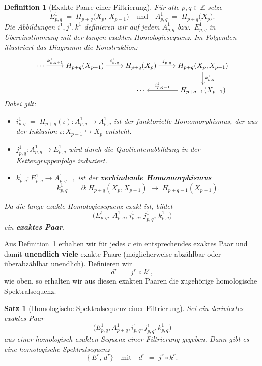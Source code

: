 \documentclass[12pt]{article}
\numberwithin{conj}{section}
\newtheorem{definition}[conj]{Definition}
\newtheorem{theorem}[conj]{Satz}
\newcommand{\Z}{\mathbb{Z}}
\begin{document}
\begin{definition}[Exakte Paare einer Filtrierung]\label{exaktFiltration}
    Für alle $p,q \in \Z$ setze
    \[
        E^1_{p,q} \;=\; H_{p+q}\bigl(X_p,\,X_{p-1}\bigr)
        \quad\text{und}\quad
        A^1_{p,q} \;=\; H_{p+q}\bigl(X_p\bigr).
    \]
    Die Abbildungen $i^1, j^1, k^1$ definieren wir auf jedem $A^1_{p,q}$ bzw.\ $E^1_{p,q}$ in Übereinstimmung mit der langen exakten Homologiesequenz. Im Folgenden illustriert das Diagramm die Konstruktion:
    \[
        \begin{tikzcd}[cramped]
            \cdots & H_{p+q}(X_{p-1}) & H_{p+q}(X_{p}) & H_{p+q}(X_{p},X_{p-1}) \\
            & {} & \cdots & H_{p+q-1}(X_{p-1})
            \arrow["{k^1_{p,q+1}}", from=1-1, to=1-2]
            \arrow["{i^1_{p,q}}", from=1-2, to=1-3]
            \arrow["{j^1_{p,q}}", from=1-3, to=1-4]
            \arrow["{k^1_{p,q}}", from=1-4, to=2-4]
            \arrow["{i^1_{p,q-1}}"', from=2-4, to=2-3]
        \end{tikzcd}
    \]
    Dabei gilt:
    \begin{itemize}[nolistsep]
        \item $i^1_{p,q} \;=\; H_{p+q}(\iota) : A^1_{p,q} \to A^1_{p,q}$ ist der funktorielle Homomorphismus, der aus der Inklusion 
              \(\iota: X_{p-1} \hookrightarrow X_p\) entsteht.
        \item $j^1_{p,q} : A^1_{p,q} \to E^1_{p,q}$ wird durch die Quotientenabbildung in der Kettengruppenfolge induziert.
        \item $k^1_{p,q} : E^1_{p,q} \to A^1_{p,q-1}$ ist der \textbf{verbindende Homomorphismus}
              \[
                k^1_{p,q} \;=\; \partial : H_{p+q}(X_p,X_{p-1}) \;\longrightarrow\; H_{p+q-1}(X_{p-1}).
              \]
    \end{itemize}
    Da die lange exakte Homologiesequenz exakt ist, bildet
    \[
        \bigl(E^1_{p,q},\,A^1_{p,q},\,i^1_{p,q},\,j^1_{p,q},\,k^1_{p,q}\bigr)
    \]
    ein \textbf{exaktes Paar}.
\end{definition}

Aus Definition~\ref{exaktFiltration} erhalten wir für jedes $r$ ein entsprechendes exaktes Paar und damit \textbf{unendlich viele} exakte Paare (möglicherweise abzählbar oder überabzählbar unendlich). Definieren wir 
\[
    d^r \;=\; j^r \,\circ\, k^r,
\]
wie oben, so erhalten wir aus diesen exakten Paaren die zugehörige homologische Spektralsequenz.

\begin{theorem}[Homologische Spektralsequenz einer Filtrierung]
    Sei ein deriviertes exaktes Paar
    \[
        \bigl(E^1_{p,q}, A^1_{p+q}, i^1_{p,q}, j^1_{p,q}, k^1_{p,q}\bigr)
    \]
    aus einer homologisch exakten Sequenz einer Filtrierung gegeben. Dann gibt es eine homologische Spektralsequenz
    \[
        \{\,E^r,\,d^r\}\quad\text{mit}\quad d^r \;=\; j^r \circ k^r.
    \]
\end{theorem}
\end{document}
